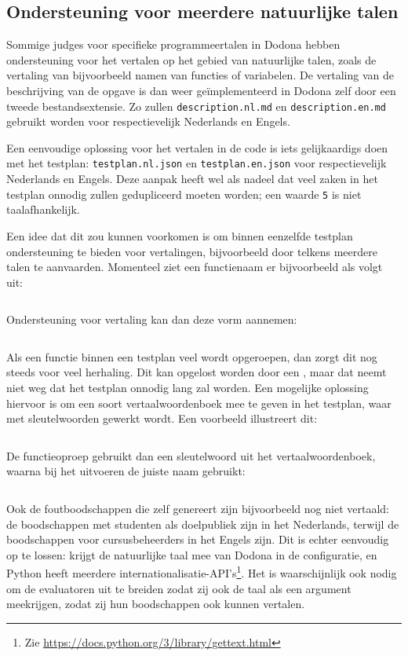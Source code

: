 \subsection{Ondersteuning voor meerdere natuurlijke talen}\label{subsec:ondersteuning-voor-natuurlijke-talen}

Sommige judges voor specifieke programmeertalen in Dodona hebben ondersteuning voor het vertalen op het gebied van natuurlijke talen, zoals de vertaling van bijvoorbeeld namen van functies of variabelen.
De vertaling van de beschrijving van de opgave is dan weer geïmplementeerd in Dodona zelf door een tweede bestandsextensie.
Zo zullen \texttt{description.nl.md} en \texttt{description.en.md} gebruikt worden voor respectievelijk Nederlands en Engels.

Een eenvoudige oplossing voor het vertalen in de code is iets gelijkaardigs doen met het testplan: \texttt{testplan.nl.json} en \texttt{testplan.en.json} voor respectievelijk Nederlands en Engels.
Deze aanpak heeft wel als nadeel dat veel zaken in het testplan onnodig zullen gedupliceerd moeten worden;
een waarde \texttt{5} is niet taalafhankelijk.

Een idee dat dit zou kunnen voorkomen is om binnen eenzelfde testplan ondersteuning te bieden voor vertalingen, bijvoorbeeld door telkens meerdere talen te aanvaarden.
Momenteel ziet een functienaam er bijvoorbeeld als volgt uit:

\inputminted{json}{code/example-name.json}

Ondersteuning voor vertaling kan dan deze vorm aannemen:

\inputminted{json}{code/example-name-trans.json}

Als een functie binnen een testplan veel wordt opgeroepen, dan zorgt dit nog steeds voor veel herhaling.
Dit kan opgelost worden door een , maar dat neemt niet weg dat het testplan onnodig lang zal worden.
Een mogelijke oplossing hiervoor is om een soort vertaalwoordenboek mee te geven in het testplan, waar met sleutelwoorden gewerkt wordt.
Een voorbeeld illustreert dit:

\inputminted{json}{code/example-name-dict.json}

De functieoproep gebruikt dan een sleutelwoord uit het vertaalwoordenboek, waarna \tested{} bij het uitvoeren de juiste naam gebruikt:

\inputminted{json}{code/example-name-key.json}

Ook de foutboodschappen die \tested{} zelf genereert zijn bijvoorbeeld nog niet vertaald: de boodschappen met studenten als doelpubliek zijn in het Nederlands, terwijl de boodschappen voor cursusbeheerders in het Engels zijn.
Dit is echter eenvoudig op te lossen: \tested{} krijgt de natuurlijke taal mee van Dodona in de configuratie, en Python heeft meerdere internationalisatie-API's\footnote{Zie \url{https://docs.python.org/3/library/gettext.html}}.
Het is waarschijnlijk ook nodig om de evaluatoren uit te breiden zodat zij ook de taal als een argument meekrijgen, zodat zij hun boodschappen ook kunnen vertalen.

